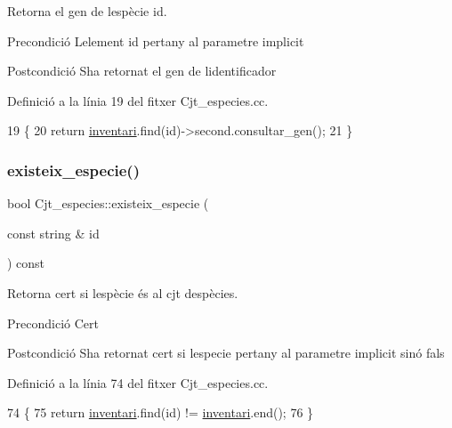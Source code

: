 Retorna el gen de l\textquotesingle{}espècie id. 

\begin{DoxyPrecond}{Precondició}
L\textquotesingle{}element id pertany al parametre implicit 
\end{DoxyPrecond}
\begin{DoxyPostcond}{Postcondició}
S\textquotesingle{}ha retornat el gen de l\textquotesingle{}identificador 
\end{DoxyPostcond}


Definició a la línia 19 del fitxer Cjt\+\_\+especies.\+cc.


\begin{DoxyCode}
19                                                       \{
20     \textcolor{keywordflow}{return} \hyperlink{class_cjt__especies_aa253bc335c8c8176b8ece5c49a15c5f3}{inventari}.find(\textcolor{keywordtype}{id})->second.consultar\_gen();
21 \}
\end{DoxyCode}
\mbox{\label{class_cjt__especies_a7fa2f303eb4e3065d87174a1c3e71942}} 
\subsubsection{\texorpdfstring{existeix\+\_\+especie()}{existeix\_especie()}}
{\footnotesize\ttfamily bool Cjt\+\_\+especies\+::existeix\+\_\+especie (\begin{DoxyParamCaption}\item[{const string \&}]{id }\end{DoxyParamCaption}) const}



Retorna cert si l\textquotesingle{}espècie és al cjt d\textquotesingle{}espècies. 

\begin{DoxyPrecond}{Precondició}
Cert 
\end{DoxyPrecond}
\begin{DoxyPostcond}{Postcondició}
S\textquotesingle{}ha retornat cert si l\textquotesingle{}especie pertany al parametre implicit sinó fals 
\end{DoxyPostcond}


Definició a la línia 74 del fitxer Cjt\+\_\+especies.\+cc.


\begin{DoxyCode}
74                                                          \{
75     \textcolor{keywordflow}{return} \hyperlink{class_cjt__especies_aa253bc335c8c8176b8ece5c49a15c5f3}{inventari}.find(\textcolor{keywordtype}{id}) != \hyperlink{class_cjt__especies_aa253bc335c8c8176b8ece5c49a15c5f3}{inventari}.end();
76 \}
\end{DoxyCode}
\mbox{\label{class_cjt__especies_abcea459e5b302c0eda1583b1dc571bff}} 
